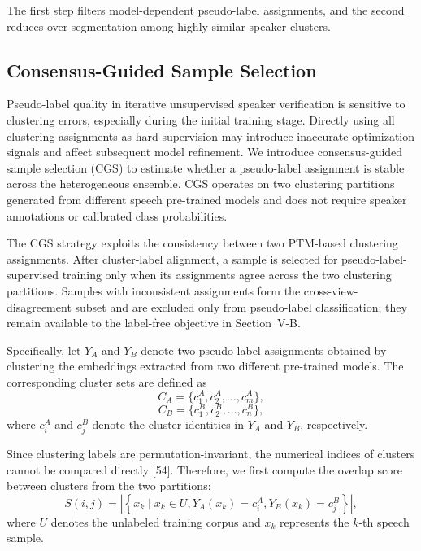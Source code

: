 \documentclass[journal]{IEEEtran}
\begin{document}
The first step filters model-dependent pseudo-label assignments, and the
second reduces over-segmentation among highly similar speaker clusters.

\subsection{Consensus-Guided Sample Selection}
\label{sec:agreement_selection}

Pseudo-label quality in iterative unsupervised speaker verification is
sensitive to clustering errors, especially during the initial training
stage.
Directly using all clustering assignments as hard supervision may
introduce inaccurate optimization signals and affect subsequent model
refinement.
We introduce consensus-guided sample selection (CGS) to estimate whether a
pseudo-label assignment is stable across the heterogeneous ensemble. CGS
operates on two clustering partitions generated from different speech
pre-trained models and does not require speaker annotations or calibrated
class probabilities.

The CGS strategy exploits the consistency between two PTM-based
clustering assignments.
After cluster-label alignment, a sample is selected for
pseudo-label-supervised training only when its assignments agree across
the two clustering partitions.
Samples with inconsistent assignments form the cross-view-disagreement
subset and are excluded only from pseudo-label classification; they remain
available to the label-free objective in Section~V-B.

Specifically, let $Y_A$ and $Y_B$ denote two pseudo-label assignments obtained by clustering the embeddings extracted from two different pre-trained models.
The corresponding cluster sets are defined as
\begin{equation}
C_A=\{c_1^A,c_2^A,\ldots,c_m^A\},
\end{equation}
\begin{equation}
C_B=\{c_1^B,c_2^B,\ldots,c_n^B\},
\end{equation}
where $c_i^A$ and $c_j^B$ denote the cluster identities in $Y_A$ and $Y_B$, respectively.

Since clustering labels are permutation-invariant, the numerical indices of clusters cannot be compared directly [54].
Therefore, we first compute the overlap score between clusters from the two partitions:
\begin{equation}
S(i,j)
=
\left|
\left\{
x_k
\mid
x_k\in U,
Y_A(x_k)=c_i^A,
Y_B(x_k)=c_j^B
\right\}
\right|,
\end{equation}
where $U$ denotes the unlabeled training corpus and $x_k$ represents the $k$-th speech sample.
\end{document}
